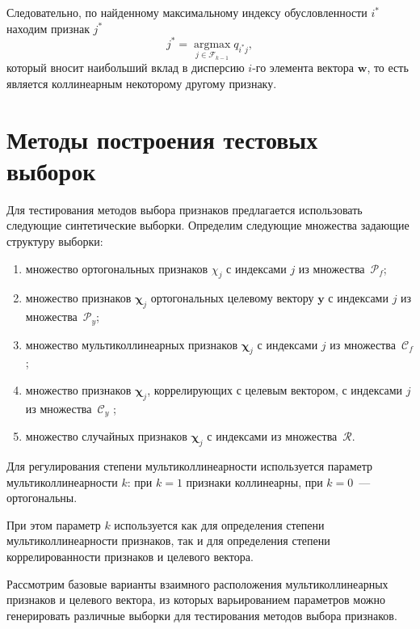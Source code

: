 \documentclass[a4paper,12pt]{article}
\newcommand{\bw}{\mathbf{w}}
\newcommand{\by}{\mathbf{y}}
\newcommand{\bchi}{\boldsymbol{\chi}}
\newcommand{\calC}{\mathcal{C}}
\newcommand{\calP}{\mathcal{P}}
\newcommand{\calR}{\mathcal{R}}
\theoremstyle{plain}
\begin{document}
Следовательно, по найденному максимальному индексу обусловленности $i^*$ находим признак $j^*$
\begin{equation}
j^* = \mathop{\arg\max}\limits_{j \in \mathcal{F}_{k-1}} q_{i^*j},
\label{eq:belsley}
\end{equation}
который вносит наибольший вклад в дисперсию $i$-го элемента вектора $\bw$, то есть является коллинеарным некоторому другому признаку.

\section{Методы построения тестовых выборок}

Для тестирования методов выбора признаков предлагается использовать следующие синтетические выборки. Определим следующие множества задающие структуру выборки: 
\begin{enumerate}[1)]
\item множество ортогональных признаков $\chi_j$ с индексами $j$ из множества~$\calP_f$;
\item множество признаков $\bchi_j$ ортогональных целевому вектору $\by$ с индексами $j$ из множества~$\calP_y$;
\item множество мультиколлинеарных признаков $\bchi_j$ с индексами $j$ из множества~$\calC_f$;
\item множество признаков $\bchi_j$, коррелирующих с целевым вектором, с индексами $j$ из множества~$\calC_y$ ;
\item множество случайных признаков $\bchi_j$ с индексами из множества~$\calR$.    
\end{enumerate}

Для регулирования степени  мультиколлинеарности используется параметр мультиколлинеарности $k$: при $k = 1$ признаки коллинеарны, при $k = 0$~--- ортогональны. 

При этом параметр $k$ используется как для определения степени мультиколлинеарности признаков, так и для определения степени коррелированности признаков и целевого вектора.

Рассмотрим базовые варианты взаимного расположения мультиколлинеарных признаков и целевого вектора, из которых варьированием параметров можно генерировать различные выборки для тестирования методов выбора признаков.

\end{document}
